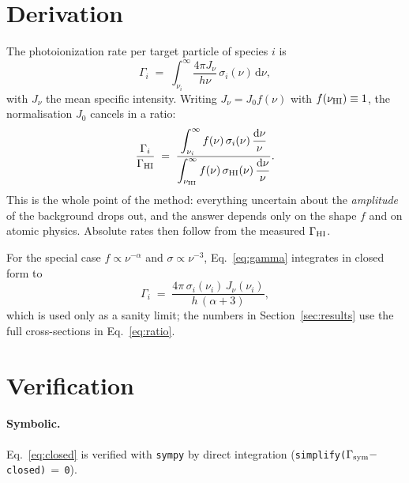 \documentclass[11pt,a4paper]{article}
\newcommand{\GHI}{\ensuremath{\Gamma_{\rm HI}}}
\begin{document}
\section{Derivation}

The photoionization rate per target particle of species $i$ is
\begin{equation}
  \Gamma_i \;=\; \int_{\nu_i}^{\infty}
      \frac{4\pi J_\nu}{h\nu}\,\sigma_i(\nu)\,\mathrm{d}\nu ,
  \label{eq:gamma}
\end{equation}
with $J_\nu$ the mean specific intensity.  Writing $J_\nu=J_0 f(\nu)$ with
$f(\nu_{\rm HI})\equiv1$, the normalisation $J_0$ cancels in a ratio:
\begin{equation}
  \frac{\Gamma_i}{\GHI} \;=\;
  \frac{\displaystyle\int_{\nu_i}^{\infty} f(\nu)\,\sigma_i(\nu)\,\frac{\mathrm{d}\nu}{\nu}}
       {\displaystyle\int_{\nu_{\rm HI}}^{\infty} f(\nu)\,\sigma_{\rm HI}(\nu)\,\frac{\mathrm{d}\nu}{\nu}} .
  \label{eq:ratio}
\end{equation}
This is the whole point of the method: everything uncertain about the
\emph{amplitude} of the background drops out, and the answer depends only on
the shape $f$ and on atomic physics.  Absolute rates then follow from the
measured \GHI.

For the special case $f\propto\nu^{-\alpha}$ and $\sigma\propto\nu^{-3}$,
Eq.~\ref{eq:gamma} integrates in closed form to
\begin{equation}
  \Gamma_i \;=\; \frac{4\pi\,\sigma_i(\nu_i)\,J_\nu(\nu_i)}{h\,(\alpha+3)} ,
  \label{eq:closed}
\end{equation}
which is used only as a sanity limit; the numbers in
Section~\ref{sec:results} use the full cross-sections in Eq.~\ref{eq:ratio}.

\section{Verification}

\paragraph{Symbolic.}
Eq.~\ref{eq:closed} is verified with \texttt{sympy} by direct integration
(\texttt{simplify($\Gamma_{\rm sym}-$closed)$\,=\,$0}).
\end{document}
